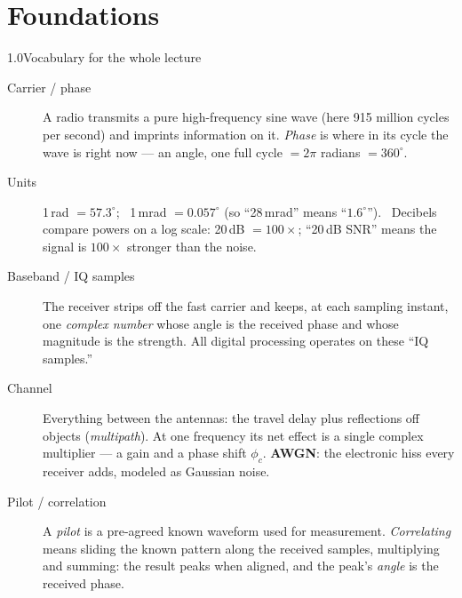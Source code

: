 \documentclass[10pt]{beamer}
\newcommand{\srcline}[1]{\par\vfill\noindent{\tiny\textcolor{gray}{Source: #1}}}
\begin{document}
\section{Foundations}

\begin{frame}{1.0\quad Vocabulary for the whole lecture}
\footnotesize
\begin{description}
\item[Carrier / phase] A radio transmits a pure high-frequency sine wave
(here 915 million cycles per second) and imprints information on it.
\emph{Phase} is where in its cycle the wave is right now --- an angle,
one full cycle $=2\pi$ radians $=360^\circ$.
\item[Units] 1\,rad $=57.3^\circ$; \ 1\,mrad $=0.057^\circ$ (so
``28\,mrad'' means ``$1.6^\circ$''). \ Decibels compare powers on a log
scale: 20\,dB $=100\times$; ``20\,dB SNR'' means the signal is
$100\times$ stronger than the noise.
\item[Baseband / IQ samples] The receiver strips off the fast carrier
and keeps, at each sampling instant, one \emph{complex number} whose
angle is the received phase and whose magnitude is the strength. All
digital processing operates on these ``IQ samples.''
\item[Channel] Everything between the antennas: the travel delay plus
reflections off objects (\emph{multipath}). At one frequency its net
effect is a single complex multiplier --- a gain and a phase shift
$\phi_c$. \textbf{AWGN}: the electronic hiss every receiver adds,
modeled as Gaussian noise.
\item[Pilot / correlation] A \emph{pilot} is a pre-agreed known
waveform used for measurement. \emph{Correlating} means sliding the
known pattern along the received samples, multiplying and summing: the
result peaks when aligned, and the peak's \emph{angle} is the received
phase.
\end{description}
\srcline{Standard definitions; kept on one slide so later slides can use the words freely.}
\end{frame}
\end{document}
